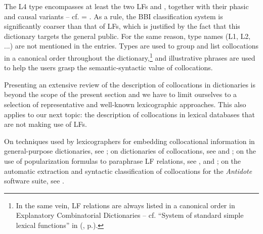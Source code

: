The L4 type encompasses at least the two LFs  and , together with their phasic and causal variants -- cf.  = . As a rule, the BBI classification system is significantly coarser than that of LFs, which is justified by the fact that this dictionary targets the general public. For the same reason, type names (L1, L2, ...) are not mentioned in the entries. Types are used to group and list collocations in a canonical order throughout the dictionary,\footnote{In the same vein, LF relations are always listed in a canonical order in Explanatory Combinatorial Dictionaries -- cf. ``System of standard simple lexical functions'' in  (, p.\thinspace\pageref{tab:systFL}).} and illustrative phrases are used to help the users grasp the semantic-syntactic value of collocations.

Presenting an extensive review of the description of collocations in dictionaries is beyond the scope of the present section and we have to limit ourselves to a selection of representative and well-known lexicographic approaches. This also applies to our next topic: the description of collocations in lexical databases that are not making use of LFs.

\begin{furtherreading}
On techniques used by lexicographers for embedding collocational information in general-purpose dictionaries, see \textcite{Gouws2015}; on dictionaries of collocations, see \textcite{Hausmann1989b} and \textcite{CorpasPastor2016}; on the use of popularization formulas to paraphrase LF relations, see \textcite{Polguere2000a}, \textcite{MelcukPolguere2007-e} and \textcite{LHomme2008}; on the automatic extraction and syntactic classification of collocations for the \textit{Antidote} software suite, see \textcite{CharestEtAl2010}.\footnotemark
\end{furtherreading}

